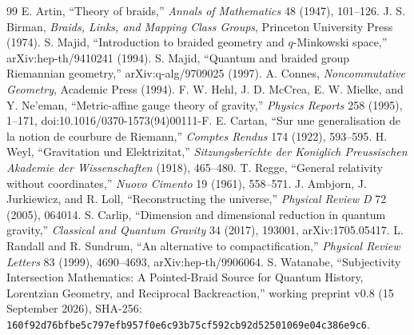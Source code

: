 \documentclass[12pt,a4paper,twoside]{article}
\begin{document}
\begin{thebibliography}{99}
\small
{} E. Artin, ``Theory of braids,'' \emph{Annals of Mathematics} 48 (1947), 101--126.
 J. S. Birman, \emph{Braids, Links, and Mapping Class Groups}, Princeton University Press (1974).
 S. Majid, ``Introduction to braided geometry and $q$-Minkowski space,'' arXiv:hep-th/9410241 (1994).
 S. Majid, ``Quantum and braided group Riemannian geometry,'' arXiv:q-alg/9709025 (1997).
 A. Connes, \emph{Noncommutative Geometry}, Academic Press (1994).
 F. W. Hehl, J. D. McCrea, E. W. Mielke, and Y. Ne'eman, ``Metric-affine gauge theory of gravity,'' \emph{Physics Reports} 258 (1995), 1--171, doi:10.1016/0370-1573(94)00111-F.
 E. Cartan, ``Sur une generalisation de la notion de courbure de Riemann,'' \emph{Comptes Rendus} 174 (1922), 593--595.
 H. Weyl, ``Gravitation und Elektrizitat,'' \emph{Sitzungsberichte der Koniglich Preussischen Akademie der Wissenschaften} (1918), 465--480.
 T. Regge, ``General relativity without coordinates,'' \emph{Nuovo Cimento} 19 (1961), 558--571.
 J. Ambjorn, J. Jurkiewicz, and R. Loll, ``Reconstructing the universe,'' \emph{Physical Review D} 72 (2005), 064014.
 S. Carlip, ``Dimension and dimensional reduction in quantum gravity,'' \emph{Classical and Quantum Gravity} 34 (2017), 193001, arXiv:1705.05417.
 L. Randall and R. Sundrum, ``An alternative to compactification,'' \emph{Physical Review Letters} 83 (1999), 4690--4693, arXiv:hep-th/9906064.
 S. Watanabe, ``Subjectivity Intersection Mathematics: A Pointed-Braid Source for Quantum History, Lorentzian Geometry, and Reciprocal Backreaction,'' working preprint v0.8 (15 September 2026), SHA-256: \texttt{160f92d76bfbe5c7\allowbreak97efb957f0e6c93b\allowbreak75cf592cb92d5250\allowbreak1069e04c386e9c6}.
\end{thebibliography}
\end{document}
